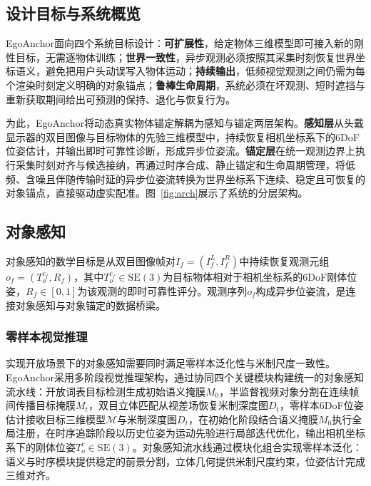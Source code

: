 \documentclass[review]{vgtc}
\begin{document}
\subsection{设计目标与系统概览}

EgoAnchor面向四个系统目标设计：\textbf{可扩展性}，给定物体三维模型即可接入新的刚性目标，无需逐物体训练；\textbf{世界一致性}，异步观测必须按照其采集时刻恢复世界坐标语义，避免把用户头动误写入物体运动；\textbf{持续输出}，低频视觉观测之间仍需为每个渲染时刻定义明确的对象锚点；\textbf{鲁棒生命周期}，系统必须在坏观测、短时遮挡与重新获取期间给出可预测的保持、退化与恢复行为。

为此，EgoAnchor将动态真实物体锚定解耦为感知与锚定两层架构。\textbf{感知层}从头戴显示器的双目图像与目标物体的先验三维模型中，持续恢复相机坐标系下的6DoF位姿估计，并输出即时可靠性诊断，形成异步位姿流。\textbf{锚定层}在统一观测边界上执行采集时刻对齐与候选接纳，再通过时序合成、静止锚定和生命周期管理，将低频、含噪且伴随传输时延的异步位姿流转换为世界坐标系下连续、稳定且可恢复的对象锚点，直接驱动虚实配准。图~\ref{fig:arch}展示了系统的分层架构。


\subsection{对象感知}\label{sec:perception}

对象感知的数学目标是从双目图像帧对$I_f = (I_f^L, I_f^R)$中持续恢复观测元组$o_f = (T_o^{c_f}, R_f)$，其中$T_o^{c_f} \in \mathrm{SE}(3)$为目标物体相对于相机坐标系的6DoF刚体位姿，$R_f \in [0,1]$为该观测的即时可靠性评分。观测序列${o_f}$构成异步位姿流，是连接对象感知与对象锚定的数据桥梁。

\subsubsection{零样本视觉推理}

实现开放场景下的对象感知需要同时满足零样本泛化性与米制尺度一致性。EgoAnchor采用多阶段视觉推理架构，通过协同四个关键模块构建统一的对象感知流水线：开放词表目标检测生成初始语义掩膜$M_0$，半监督视频对象分割在连续帧间传播目标掩膜$M_t$，双目立体匹配从视差场恢复米制深度图$D_t$，零样本6DoF位姿估计接收目标三维模型$\mathcal{M}$与米制深度图$D_t$，在初始化阶段结合语义掩膜$M_0$执行全局注册，在时序追踪阶段以历史位姿为运动先验进行局部迭代优化，输出相机坐标系下的刚体位姿$T_o^c \in \mathrm{SE}(3)$。对象感知流水线通过模块化组合实现零样本泛化：语义与时序模块提供稳定的前景分割，立体几何提供米制尺度约束，位姿估计完成三维对齐。
\end{document}

